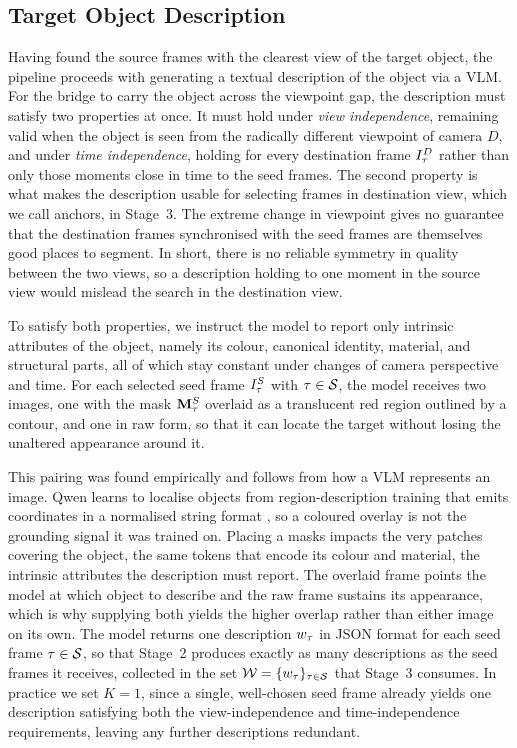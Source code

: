 \subsection{Target Object Description}
\label{subsec:Stage2}
Having found the source frames with the clearest view of the target object, the pipeline proceeds with generating a textual description of the object via a VLM. For the bridge to carry the object across the viewpoint gap, the description must satisfy two properties at once. It must hold under \emph{view independence}, remaining valid when the object is seen from the radically different viewpoint of camera $D$, and under \emph{time independence}, holding for every destination frame $I^D_\tau$ rather than only those moments close in time to the seed frames. The second property is what makes the description usable for selecting  frames in destination view, which we call anchors, in Stage~3. The extreme change in viewpoint gives no guarantee that the destination frames synchronised with the seed frames are themselves good places to segment. In short, there is no reliable symmetry in quality between the two views, so a description holding to one moment in the source view would mislead the search in the destination view.

To satisfy both properties, we instruct the model to report only intrinsic attributes of the object, namely its colour, canonical identity, material, and structural parts, all of which stay constant under changes of camera perspective and time. For each selected seed frame $I^S_\tau$ with $\tau \in \mathcal{S}$, the model receives two images, one with the mask $\mathbf{M}^S_\tau$ overlaid as a translucent red region outlined by a contour, and one in raw form, so that it can locate the target without losing the unaltered appearance around it.

This pairing was found empirically and follows from how a VLM represents an image. Qwen learns to localise objects from region-description training that emits coordinates in a normalised string format \cite{qwen2025qwen25vl}, so a coloured overlay is not the grounding signal it was trained on. Placing a masks impacts the very patches covering the object, the same tokens that encode its colour and material, the intrinsic attributes the description must report. The overlaid frame points the model at which object to describe and the raw frame sustains its appearance, which is why supplying both yields the higher overlap rather than either image on its own. The model returns one description $w_\tau$ in JSON format for each seed frame $\tau \in \mathcal{S}$, so that Stage~2 produces exactly as many descriptions as the seed frames it receives, collected in the set $\mathcal{W} = \{w_\tau\}_{\tau \in \mathcal{S}}$ that Stage~3 consumes. In practice we set $K = 1$, since a single, well-chosen seed frame already yields one description satisfying both the view-independence and time-independence requirements, leaving any further descriptions redundant. 

